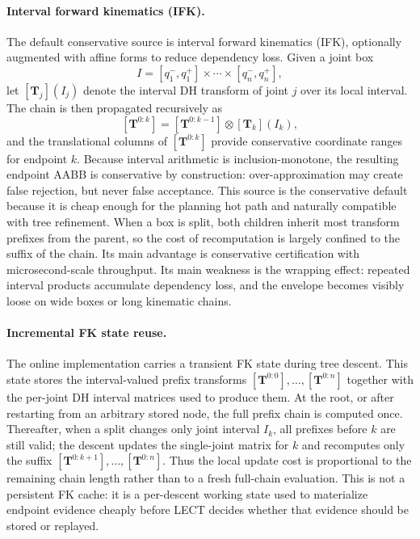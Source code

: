 \documentclass[journal]{IEEEtran}
\begin{document}
\paragraph{Interval forward kinematics (IFK).}
The default conservative source is interval forward kinematics (IFK), optionally
augmented with affine forms to reduce dependency loss. Given a joint box
\[
I = [q_1^-,q_1^+] \times \cdots \times [q_n^-,q_n^+],
\]
let $[\bm{T}_j](I_j)$ denote the interval DH transform of joint $j$ over its
local interval. The chain is then propagated recursively as
\[
[\bm{T}^{0:k}] = [\bm{T}^{0:k-1}] \otimes [\bm{T}_k](I_k),
\]
and the translational columns of $[\bm{T}^{0:k}]$ provide conservative
coordinate ranges for endpoint $k$. Because interval arithmetic is
inclusion-monotone, the resulting endpoint AABB is conservative by
construction: over-approximation may create false rejection, but never false
acceptance. This source is the conservative default because it is cheap enough for
the planning hot path and naturally compatible with tree refinement. When a box
is split, both children inherit most transform prefixes from the parent, so the
cost of recomputation is largely confined to the suffix of the chain. Its main
advantage is conservative certification with microsecond-scale throughput. Its main
weakness is the wrapping effect: repeated interval products accumulate
dependency loss, and the envelope becomes visibly loose on wide boxes or long
kinematic chains.

\paragraph{Incremental FK state reuse.}
The online implementation carries a transient FK state during tree descent. This
state stores the interval-valued prefix transforms
$[\bm{T}^{0:0}],\ldots,[\bm{T}^{0:n}]$ together with the per-joint DH interval
matrices used to produce them. At the root, or after restarting from an
arbitrary stored node, the full prefix chain is computed once. Thereafter, when
a split changes only joint interval $I_k$, all prefixes before $k$ are still
valid; the descent updates the single-joint matrix for $k$ and recomputes only
the suffix $[\bm{T}^{0:k+1}],\ldots,[\bm{T}^{0:n}]$. Thus the local update cost
is proportional to the remaining chain length rather than to a fresh full-chain
evaluation. This is not a persistent FK cache: it is a per-descent working state
used to materialize endpoint evidence cheaply before LECT decides whether that
evidence should be stored or replayed.
\end{document}
